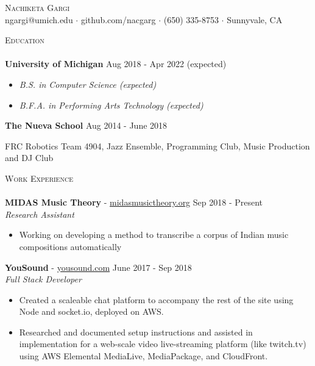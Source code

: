 \documentclass[a4paper]{article}
\newcommand{\lineunder} {
    \vspace*{-8pt} \\
    \hspace*{-18pt} \hrulefill \\
}
\newcommand{\header} [1] {
    {\hspace*{-18pt}\vspace*{6pt} \textsc{#1}}
    \vspace*{-6pt} \lineunder
}
\begin{document}
\vspace*{-40pt}
    

\begin{center}
	{\Huge \scshape {Nachiketa Gargi}}\\
	ngargi@umich.edu $\cdot$ github.com/nacgarg $\cdot$ (650) 335-8753 $\cdot$ Sunnyvale, CA \\
\end{center}
\header{Education}

\noindent
\textbf{University of Michigan} \hfill Aug 2018 - Apr 2022 (expected)
\vspace{-2mm}
\begin{itemize}
    \setlength{\itemindent}{-3mm}
    \item[] \textit{B.S. in Computer Science (expected)}\vspace{-3mm}
    \item[] \textit{B.F.A. in Performing Arts Technology (expected)}
\end{itemize}
\noindent
\textbf{The Nueva School} \hfill Aug 2014 - June 2018\\
\vspace{-4mm}

FRC Robotics Team 4904, Jazz Ensemble, Programming Club, Music Production and DJ Club\\


\noindent
\header{Work Experience}

\noindent
\textbf{MIDAS Music Theory} - \url{midasmusictheory.org} \hfill Sep 2018 - Present\\
\textit{Research Assistant} \\ 
\vspace{-6mm}
\begin{itemize}
    \item Working on developing a method to transcribe a corpus of Indian music compositions automatically
\end{itemize}

\noindent
\textbf{YouSound} - \url{yousound.com} \hfill June 2017 - Sep 2018\\
\textit{Full Stack Developer} \\
\vspace{-6mm}
\begin{itemize} \itemsep 0.1pt
	\item Created a scaleable chat platform to accompany the rest of the site using Node and socket.io, deployed on AWS.
	\item Researched and documented setup instructions and assisted in implementation for a web-scale video live-streaming platform (like twitch.tv) using AWS Elemental MediaLive, MediaPackage, and CloudFront.
\end{itemize}
\end{document}
